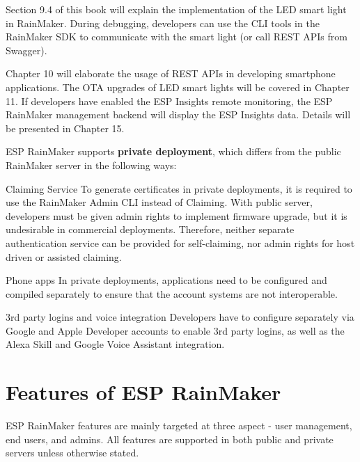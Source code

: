 \documentclass[a4paper,12pt]{book}
\begin{document}
Section 9.4 of this book will explain the implementation of the LED smart light in RainMaker. During debugging, developers can use the CLI tools in the RainMaker SDK to communicate with the smart light (or call REST APIs from Swagger).

Chapter 10 will elaborate the usage of REST APIs in developing smartphone applications. The OTA upgrades of LED smart lights will be covered in Chapter 11. If developers have enabled the ESP Insights remote monitoring, the ESP RainMaker management backend will display the ESP Insights data. Details will be presented in Chapter 15.

ESP RainMaker supports \textbf{private deployment}, which differs from the public RainMaker server in the following ways:

\begin{term}{Claiming Service}
    To generate certificates in private deployments, it is required to use the RainMaker Admin CLI instead of Claiming. With public server, developers must be given admin rights to implement firmware upgrade, but it is undesirable in commercial deployments. Therefore, neither separate authentication service can be provided for self-claiming, nor admin rights for host driven or assisted claiming.
\end{term}

\begin{term}{Phone apps}
    In private deployments, applications need to be configured and compiled separately to ensure that the account systems are not interoperable.
\end{term}

\begin{term}{3rd party logins and voice integration}
    Developers have to configure separately via Google and Apple Developer accounts to enable 3rd party logins, as well as the Alexa Skill and Google Voice Assistant integration.
\end{term}


\section{Features of ESP RainMaker}
ESP RainMaker features are mainly targeted at three aspect - user management, end users, and admins. All features are supported in both public and private servers unless otherwise stated.
\end{document}
